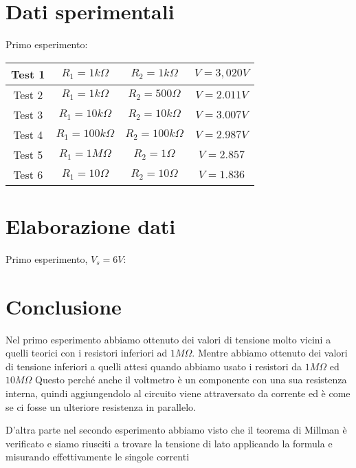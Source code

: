     

    \section{Dati sperimentali}
    Primo esperimento: \par
    \begin{tabular}{|c|c|c|c|}
        \hline
        Test 1 & $R_1 =1k\Omega$ & $R_2=1k\Omega$ & $V=3,020V$\\
        \hline
        Test 2 & $R_1 =1k\Omega$ & $R_2=500\Omega$ & $V=2.011V$\\
        \hline
        Test 3 & $R_1 =10k\Omega$ & $R_2=10k\Omega$ & $V=3.007V$\\
        \hline
        Test 4 & $R_1 =100k\Omega$ & $R_2=100k\Omega$ & $V=2.987V$\\
        \hline
        Test 5 & $R_1 =1M\Omega$ & $R_2=1\Omega$ & $V=2.857$\\
        \hline
        Test 6 & $R_1 =10\Omega$ & $R_2=10\Omega$ & $V=1.836$\\
        \hline
    \end{tabular}


    
    \section{Elaborazione dati}
    Primo esperimento, $V_s = 6V$:

    \section{Conclusione}
    Nel primo esperimento abbiamo ottenuto dei valori di tensione molto vicini a quelli teorici con i resistori inferiori ad $1M\Omega$.
    Mentre abbiamo ottenuto dei valori di tensione inferiori a quelli attesi quando abbiamo usato i resistori da $1M\Omega$ ed $10M\Omega$
    Questo perché anche il voltmetro è un componente con una sua resistenza interna, quindi aggiungendolo al circuito
    viene attraversato da corrente ed è come se ci fosse un ulteriore resistenza in parallelo.

    D'altra parte nel secondo esperimento abbiamo visto che il teorema di Millman è verificato e siamo riusciti a trovare la tensione
    di lato applicando la formula e misurando effettivamente le singole correnti 



